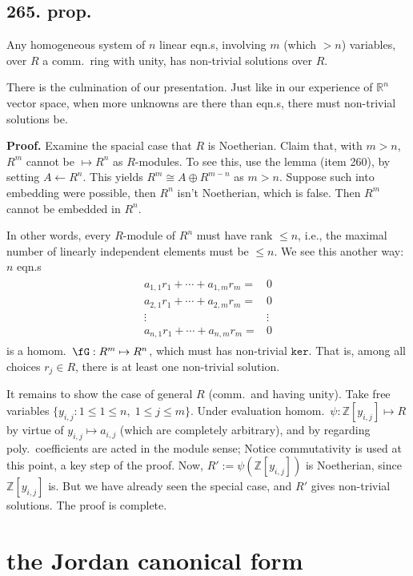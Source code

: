 \documentclass[12pt]{article}
\newcommand{\Mp}\mapsto%
\newcommand{\BF}[1]{ \mathbb{#1} }%
\newcommand{\Ss}[1]{\textsf{\bfseries{#1}}}%
\newcommand{\Tw}[1]{\texttt{#1}}%
\begin{document}
\subsection*{265. prop.} Any homogeneous system of \(n\) linear eqn.s, involving \(m\) (which \(>n\)) variables, over \(R\) a comm.\ ring with unity, has non-trivial solutions over \(R\). \par
There is the culmination of our presentation. Just like in our experience of \(\BF{R}^n\) vector space, when more unknowns are there than eqn.s, there must non-trivial solutions be. \par
\Ss{Proof.} Examine the spacial case that \(R\) is Noetherian. 
Claim that, with \(m>n\), \(R^m\) cannot be \(\Mp R^n\) as \(R\)-modules. 
To see this, use the lemma (item 260), by setting \(A \leftarrow R^n\). 
This yields \(R^m \cong A \oplus R^{m-n}\) as \(m>n\). 
Suppose such into embedding were possible, then \(R^n\) isn't Noetherian, which is false. 
Then \(R^m\) cannot be embedded in \(R^n\). \par
In other words, every \(R\)-module of \(R^n\) must have rank \(\leq n\), i.e., the maximal number of linearly independent elements must be \(\leq n\). 
We see this another way: \(n\) eqn.s \begin{gather*} \begin{matrix}
 a_{1,1} r_1 +\dotsb+ a_{1,m} r_m =&0 \\
 a_{2,1} r_1 +\dotsb+ a_{2,m} r_m =&0 \\
 \vdots &\vdots \\
 a_{n,1} r_1 +\dotsb+ a_{n,m} r_m =&0
\end{matrix} \end{gather*} is a homom.\ \(\fG: R^m \Mp R^n\), which must has non-trivial \(\Tw{ker}\). 
That is, among all choices \(r_j \in R\), there is at least one non-trivial solution. \par
It remains to show the case of general \(R\) (comm.\ and having unity). 
Take free variables \(\{y_{i,j}: 1 \leq 1 \leq n,\; 1 \leq j \leq m\}\). 
Under evaluation homom.\ \(\psi: \BF{Z}[y_{i,j}] \Mp R\) by virtue of \(y_{i,j} \Mp a_{i,j}\) (which are completely arbitrary), 
and by regarding poly.\ coefficients are acted in the module sense; 
Notice commutativity is used at this point, a key step of the proof. 
Now, \(R' := \psi(\BF{Z}[y_{i,j}])\) is Noetherian, since \(\BF{Z}[y_{i,j}]\) is. 
But we have already seen the special case, and \(R'\) gives non-trivial solutions. The proof is complete. 

\section{the Jordan canonical form}
\end{document}
